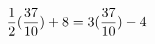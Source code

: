 \documentclass[preview]{standalone}
\begin{document}
\begin{align*}
\special{dvisvgm:raw <g id='unique000'>}\frac{1}{2} (\frac{37}{10}) + 8 = 3(\frac{37}{10}) - 4\special{dvisvgm:raw </g>}
\end{align*}
\end{document}
